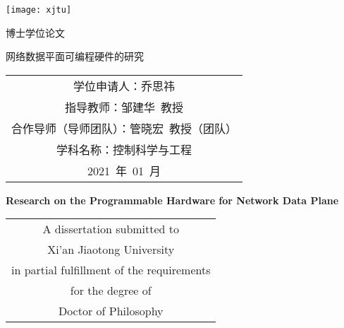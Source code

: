 
\begin{titlepage}
	\begin{center}
		\begin{figure*}[!ht]\vspace{5em}
			\centering
			\texttt{[image: xjtu]}
		\end{figure*}
		
		\vspace{1.5em}
		\begin{center} { 博士学位论文} \end{center}
		
		\vspace{8.5em}
		\begin{center} {\sanhao\boldsong 网络数据平面可编程硬件的研究}\end{center}
		
		\vspace{15em}
		{\sanhao
			\begin{center} \renewcommand{\arraystretch}{1.5}
				\begin{tabular}{c}
					学位申请人：乔思祎 \\
					指导教师：邹建华~教授 \\
					合作导师（导师团队）：管晓宏~教授（团队）\\
					学科名称：控制科学与工程 \\
					2021~年~01~月 \\
				\end{tabular} \renewcommand{\arraystretch}{1}
			\end{center} 
		}
	\end{center}
	\clearpage{\pagestyle{empty}\cleardoublepage}
	
	\newpage\thispagestyle{empty}
	\begin{center}
		\parbox[t][0.7cm][t]{\textwidth}{}
		
		\begin{center}{\sanhao\bfseries Research on the Programmable Hardware for Network Data Plane}\end{center}
		
		\vspace{4.7cm}
		{\sanhao
			\begin{center} \renewcommand{\arraystretch}{1.4}
				\begin{tabular}{c}
					A dissertation submitted to  \\
					Xi'an Jiaotong University \\
					in partial fulfillment of the requirements \\
					for the degree of \\
					Doctor of Philosophy \\
				\end{tabular} \renewcommand{\arraystretch}{1}
			\end{center} 
		}
		

\end{center}
\end{titlepage}
